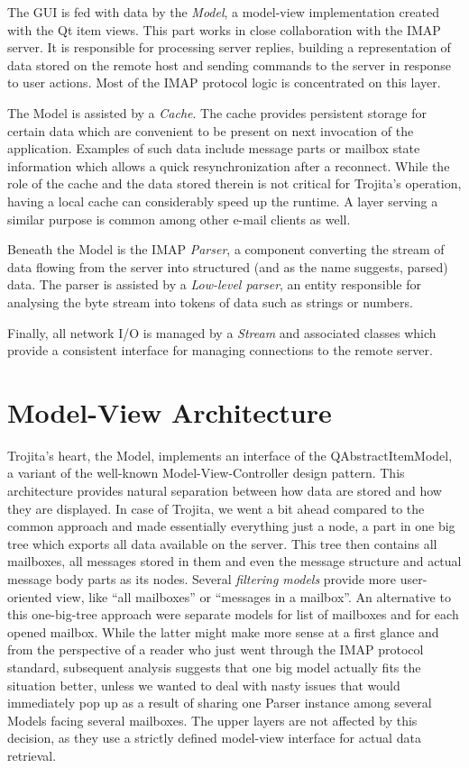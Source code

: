 \documentclass[12pt,notitlepage]{report}
\newcommand{\trojita}{Trojita\xspace}
\begin{document}
The GUI is fed with data by the {\em Model}, a model-view implementation created
with the Qt item views.  This part works in close collaboration with the IMAP
server. It is responsible for processing server replies, building a
representation of data stored on the remote host and sending commands to the
server in response to user actions.  Most of the IMAP protocol logic is
concentrated on this layer.

The Model is assisted by a {\em Cache}.  The cache provides persistent storage
for certain data which are convenient to be present on next invocation of the
application.  Examples of such data include message parts or mailbox state
information which allows a quick resynchronization after a reconnect.  While the
role of the cache and the data stored therein is not critical for \trojita's
operation, having a local cache can considerably speed up the runtime.  A layer
serving a similar purpose is common among other e-mail clients as well.

Beneath the Model is the IMAP {\em Parser}, a component converting the stream of
data flowing from the server into structured (and as the name suggests, parsed)
data.  The parser is assisted by a {\em Low-level parser}, an entity responsible
for analysing the byte stream into tokens of data such as strings or numbers.

Finally, all network I/O is managed by a {\em Stream} and associated classes
which provide a consistent interface for managing connections to the remote
server.

\section{Model-View Architecture}
\label{big-tree}

\trojita's heart, the Model, implements an interface of the QAbstractItemModel,
a variant of the well-known Model-View-Controller design pattern.
This architecture provides natural separation between how data are stored and
how they are displayed.  In case of \trojita, we went a bit ahead compared to
the common approach and made essentially everything just a node, a part in one
big tree which exports all data available on the server.  This tree then
contains all mailboxes, all messages stored in them and even the message
structure and actual message body parts as its nodes. Several {\em filtering
models} provide more user-oriented view, like ``all mailboxes'' or ``messages in
a mailbox''.  An alternative to this one-big-tree approach were separate models
for list of mailboxes and for each opened mailbox.  While the latter might make
more sense at a first glance and from the perspective of a reader who just went
through the IMAP protocol standard, subsequent analysis suggests that one big
model actually fits the situation better, unless we wanted to deal with nasty
issues that would immediately pop up as a result of sharing one Parser instance
among several Models facing several mailboxes.  The upper layers are not
affected by this decision, as they use a strictly defined model-view interface
for actual data retrieval.
\end{document}
